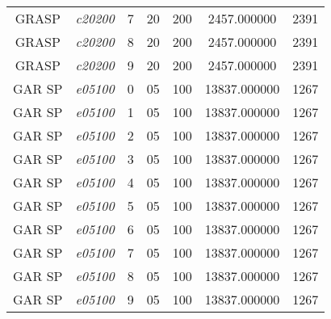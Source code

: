 {\begin{longtable}{cc|c|cc|cc}
			GRASP              & \textit{c20200}    & 7                               & 20               & 200              & 2457.000000                          & 2391 \\ 
			GRASP              & \textit{c20200}    & 8                               & 20               & 200              & 2457.000000                          & 2391 \\ 
			GRASP              & \textit{c20200}    & 9                               & 20               & 200              & 2457.000000                          & 2391 \\ \hline
			GAR SP             & \textit{e05100}    & 0                               & 05               & 100              & 13837.000000                          & 1267 \\ 
			GAR SP             & \textit{e05100}    & 1                               & 05               & 100              & 13837.000000                          & 1267 \\ 
			GAR SP             & \textit{e05100}    & 2                               & 05               & 100              & 13837.000000                          & 1267 \\ 
			GAR SP             & \textit{e05100}    & 3                               & 05               & 100              & 13837.000000                          & 1267 \\ 
			GAR SP             & \textit{e05100}    & 4                               & 05               & 100              & 13837.000000                          & 1267 \\ 
			GAR SP             & \textit{e05100}    & 5                               & 05               & 100              & 13837.000000                          & 1267 \\ 
			GAR SP             & \textit{e05100}    & 6                               & 05               & 100              & 13837.000000                          & 1267 \\ 
			GAR SP             & \textit{e05100}    & 7                               & 05               & 100              & 13837.000000                          & 1267 \\ 
			GAR SP             & \textit{e05100}    & 8                               & 05               & 100              & 13837.000000                          & 1267 \\ 
			GAR SP             & \textit{e05100}    & 9                               & 05               & 100              & 13837.000000                          & 1267 \\ \hline

\end{longtable}}
